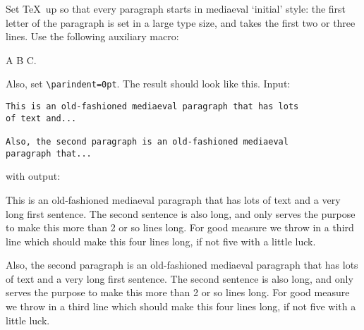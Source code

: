 Set \TeX\ up so that every paragraph starts in mediaeval `initial'
style: the first letter of the paragraph is set in a large type size,
and takes the first two or three lines.
Use the following auxiliary macro:


\begin{examplewithcode}
A \Hang{$\bullet$} B  C. \bigskip
\end{examplewithcode}
Also, set \verb+\parindent=0pt+. The result should look like this. Input:
\begin{verbatim}
This is an old-fashioned mediaeval paragraph that has lots
of text and...

Also, the second paragraph is an old-fashioned mediaeval
paragraph that...
\end{verbatim}
\smallskip with output:\par\medskip
\begin{minipage}{3in}
\def\biginitial#1{\hskip-20pt \Hang{\huge #1}\hskip 20pt}
\parindent=0pt
\everypar{\hangafter=-2 \hangindent=20pt \biginitial}
This is an old-fashioned mediaeval paragraph that has lots of text and
a very long first sentence. The second sentence is also long, and only
serves the purpose to make this more than 2 or so lines long. For good
measure we throw in a third line which should make this four lines
long, if not five with a little luck.

Also, the second paragraph is an old-fashioned mediaeval paragraph that
has lots of text and a very long first sentence. The second sentence
is also long, and only serves the purpose to make this more than 2 or
so lines long. For good measure we throw in a third line which should
make this four lines long, if not five with a little luck.
\end{minipage}
